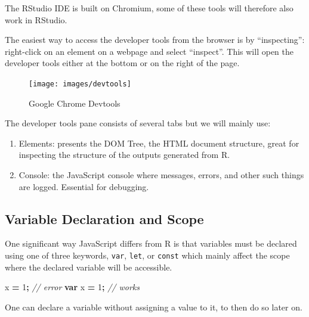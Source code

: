 \documentclass[10pt,]{krantz}
\makeatletter
\newenvironment{Shaded}{\begin{snugshade}}{\end{snugshade}}
\newcommand{\CommentTok}[1]{\textcolor[rgb]{0.37,0.37,0.37}{\textit{#1}}}
\newcommand{\DecValTok}[1]{\textcolor[rgb]{0.06,0.06,0.06}{#1}}
\newcommand{\KeywordTok}[1]{\textcolor[rgb]{0.27,0.27,0.27}{\textbf{#1}}}
\newcommand{\NormalTok}[1]{#1}
\newcommand{\OperatorTok}[1]{\textcolor[rgb]{0.43,0.43,0.43}{\textbf{#1}}}
\providecommand{\tightlist}{%
  \setlength{\itemsep}{0pt}\setlength{\parskip}{0pt}}
\newenvironment{kframe}{%
\medskip{}
\setlength{\fboxsep}{.8em}
 \def\at@end@of@kframe{}%
 \ifinner\ifhmode%
  \def\at@end@of@kframe{\end{minipage}}%
  \begin{minipage}{\columnwidth}%
 \fi\fi%
 \def\FrameCommand##1{\hskip\@totalleftmargin \hskip-\fboxsep
 \colorbox{shadecolor}{##1}\hskip-\fboxsep
     \hskip-\linewidth \hskip-\@totalleftmargin \hskip\columnwidth}%
 \MakeFramed {\advance\hsize-\width
   \@totalleftmargin\z@ \linewidth\hsize
   \@setminipage}}%
 {\par\unskip\endMakeFramed%
 \at@end@of@kframe}
\renewenvironment{Shaded}{\begin{kframe}}{\end{kframe}}
\newenvironment{rmdblock}[1]
  {
  \begin{itemize}
  \renewcommand{\labelitemi}{
    \raisebox{-.7\height}[0pt][0pt]{
      {\setkeys{Gin}{width=3em,keepaspectratio}\texttt{[image: images/\#1]}}
    }
  }
  \setlength{\fboxsep}{1em}
  \begin{kframe}
  \item
  }
  {
  \end{kframe}
  \end{itemize}
  }
\newenvironment{rmdnote}
  {\begin{rmdblock}{note}}
  {\end{rmdblock}}
\makeatother
\begin{document}
\begin{rmdnote}
The RStudio IDE is built on Chromium, some of these tools will therefore
also work in RStudio.
\end{rmdnote}

The easiest way to access the developer tools from the browser is by ``inspecting'': right-click on an element on a webpage and select ``inspect''. This will open the developer tools either at the bottom or on the right of the page.

\begin{figure}[H]

{\centering \texttt{[image: images/devtools]} 

}

\caption{Google Chrome Devtools}\label{fig:chrome-devtools}
\end{figure}

The developer tools pane consists of several tabs but we will mainly use:

\begin{enumerate}
\def\labelenumi{\arabic{enumi}.}
\tightlist
\item
  Elements: presents the DOM Tree, the HTML document structure, great for inspecting the structure of the outputs generated from R.
\item
  Console: the JavaScript console where messages, errors, and other such things are logged. Essential for debugging.
\end{enumerate}

\hypertarget{basics-var-scope}{%
\subsection{Variable Declaration and Scope}\label{basics-var-scope}}

One significant way JavaScript differs from R is that variables must be declared using one of three keywords, \texttt{var}, \texttt{let}, or \texttt{const} which mainly affect the scope where the declared variable will be accessible.

\begin{Shaded}
\begin{Highlighting}[]
\NormalTok{x }\OperatorTok{=} \DecValTok{1}\OperatorTok{;} \CommentTok{// error}
\KeywordTok{var}\NormalTok{ x }\OperatorTok{=} \DecValTok{1}\OperatorTok{;} \CommentTok{// works}
\end{Highlighting}
\end{Shaded}

One can declare a variable without assigning a value to it, to then do so later on.
\end{document}
